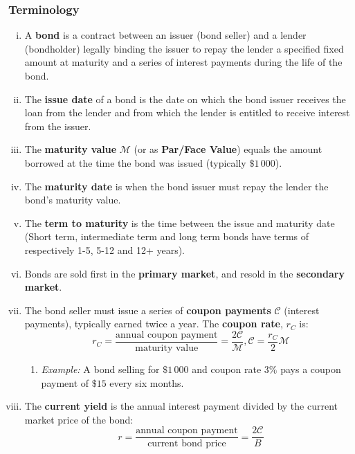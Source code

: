 \subsubsection{Terminology}
\begin{enumerate}[i.]
    \item A \textbf{bond} is a contract between an issuer (bond seller) and a lender (bondholder) legally binding the issuer to repay the lender a specified fixed amount at maturity and a series of interest payments during the life of the bond.

    \item The \textbf{issue date} of a bond is the date on which the bond issuer receives the loan from the lender and from which the lender is entitled to receive interest from the issuer.

    \item The \textbf{maturity value} \(\mathcal{M}\) (or as \textbf{Par/Face Value}) equals the amount borrowed at the time the bond was issued (typically \(\$1\,000\)).

    \item The \textbf{maturity date} is when the bond issuer must repay the lender the bond's maturity value.

    \item The \textbf{term to maturity} is the time between the issue and maturity date (Short term, intermediate term and long term bonds have terms of respectively 1-5, 5-12 and 12+ years).

    \item Bonds are sold first in the \textbf{primary market}, and resold in the \textbf{secondary market}.

    \item The bond seller must issue a series of \textbf{coupon payments} \(\mathcal{C}\) (interest payments), typically earned twice a year. The \textbf{coupon rate}, \(r_C\) is:
    \begin{equation*}
        r_C = \frac{\text{annual coupon payment}}{\text{maturity value}} = \frac{2\mathcal{C}}{\mathcal{M}}, \mathcal{C} = \frac{r_C}{2}\mathcal{M}
    \end{equation*}
    \begin{enumerate}
        \item \textit{Example: } A bond selling for \(\$1\,000\) and coupon rate \(3\%\) pays a coupon payment of \(\$15\) every six months.
    \end{enumerate}

    \item The \textbf{current yield} is the annual interest payment divided by the current market price of the bond:
    \begin{equation*}
        r = \frac{\text{annual coupon payment}}{\text{current bond price}} = \frac{2\mathcal{C}}{B}
    \end{equation*}


\end{enumerate}
